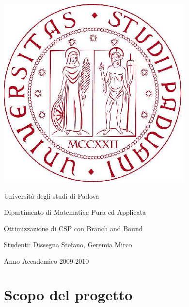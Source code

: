 \documentclass[a4paper,12pt,italian]{article}
\title{\titolo}
\author{\autore}
\newcommand{\titolo}{Ottimizzazione di CSP con Branch and Bound}
\newcommand{\autore}{Dissegna Stefano, Geremia Mirco}
\begin{document}
\begin{titlepage}
\begin{center}
\includegraphics[scale=0.3]{unipd-logo.png} 

\par
\vspace{0.5in}
{\Huge Universit\`a degli studi di Padova}
\par
\vspace{0.5in}
{\LARGE Dipartimento di Matematica Pura ed Applicata}
\par
\vspace{0.3in}
\par
\vspace{0.5in}
{\huge \titolo}
\par
\end{center}
\vspace{0.5in}
\begin{center}
{\Large Studenti: \autore}
\par
\vspace{0.3in}
\end{center}
\par
\vspace{0.5in}
\begin{center}
Anno Accademico 2009-2010
\end{center}

\end{titlepage}

\tableofcontents
\newpage

\section{Scopo del progetto}
\end{document}

